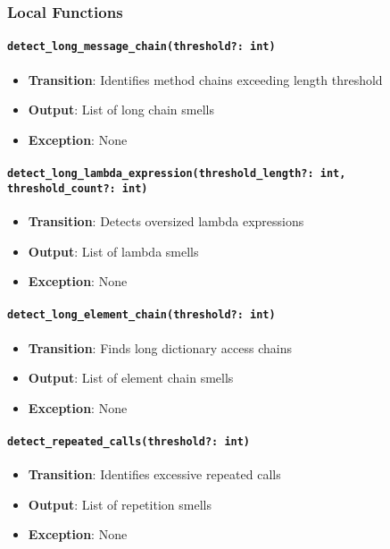 \documentclass[12pt, titlepage]{article}
\begin{document}
\subsubsection{Local Functions}

\paragraph{\texttt{detect\_long\_message\_chain(threshold?: int)}}
\begin{itemize}
\item \textbf{Transition}: Identifies method chains exceeding length threshold
\item \textbf{Output}: List of long chain smells
\item \textbf{Exception}: None
\end{itemize}

\paragraph{\texttt{detect\_long\_lambda\_expression(threshold\_length?: int, threshold\_count?: int)}}
\begin{itemize}
\item \textbf{Transition}: Detects oversized lambda expressions
\item \textbf{Output}: List of lambda smells
\item \textbf{Exception}: None
\end{itemize}

\paragraph{\texttt{detect\_long\_element\_chain(threshold?: int)}}
\begin{itemize}
\item \textbf{Transition}: Finds long dictionary access chains
\item \textbf{Output}: List of element chain smells
\item \textbf{Exception}: None
\end{itemize}

\paragraph{\texttt{detect\_repeated\_calls(threshold?: int)}}
\begin{itemize}
\item \textbf{Transition}: Identifies excessive repeated calls
\item \textbf{Output}: List of repetition smells
\item \textbf{Exception}: None
\end{itemize}
\end{document}
